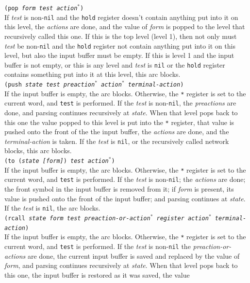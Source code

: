 \documentclass{book}
\begin{document}
{\tt (pop {\it form test action$^*$})} \\
If {\it test} is non-{\tt nil} and the {\tt hold} register
doesn't contain anything put into it on this level, the {\it actions} are done, and the value of
{\it form} is popped to the level that recursively called this one.  If this is the top level (level
1), then not only must {\it test} be non-{\tt nil} and the {\tt hold} register not contain anything
put into it on this level, but also the input buffer must be empty.  If this is level 1 and the
input buffer is not empty, or this is any level and {\it test} is {\tt nil} or the {\tt hold}
register contains something put into it at this level, this arc blocks.  \\[2ex]
{\tt (push {\it state test preaction$^*$ action$^*$ terminal-action})} \\
If the input buffer is empty, the arc blocks.  Otherwise, the \verb|*| register is set to the current word,
and {\tt test} is performed.  If the {\it test} is non-{\tt nil}, the {\it preactions} are done, and parsing
continues recursively at {\it state}.  When that level pops back to this one the value popped to this level
is put into the \verb|*| register, that value is pushed onto the front of the the input buffer, the {\it
actions} are done, and the {\it terminal-action} is taken.  If the {\it test} is {\tt nil}, or the
recursively called network blocks, this arc blocks.  \\[2ex]
{\tt (to ({\it state [form]\/}) {\it test action$^*$})} \\
If the input buffer is empty, the arc blocks.  Otherwise, the \verb|*| register is set to the current word,
and {\tt test} is performed.  If the {\it test} is non-{\tt nil}; the {\it actions} are done; the front
symbol in the input buffer is removed from it; if {\it form} is present, its value is pushed onto the front
of the input buffer; and parsing continues at {\it state}.  If the {\it test} is {\tt nil}, the arc blocks.
\\[2ex]
{\tt (rcall {\it state form test preaction-or-action$^*$ register action$^*$ terminal-action})} \\
If the input buffer is empty, the arc blocks.  Otherwise, the \verb|*| register is set to the current word,
and {\tt test} is performed.  If the {\it test} is non-{\tt nil} the {\it preaction-or-actions} are done, the
current input buffer is saved and replaced by the value of {\it form}, and parsing continues recursively at
{\it state}.  When that level pops back to this one, the input buffer is restored as it was saved, the value
\end{document}
